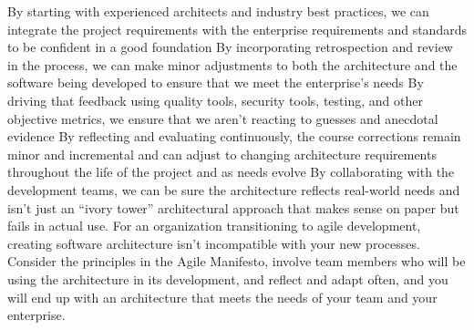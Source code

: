 By starting with experienced architects and industry best practices, we can integrate the project requirements with the enterprise requirements and standards to be confident in a good foundation
By incorporating retrospection and review in the process, we can make minor adjustments to both the architecture and the software being developed to ensure that we meet the enterprise's needs
By driving that feedback using quality tools, security tools, testing, and other objective metrics, we ensure that we aren't reacting to guesses and anecdotal evidence
By reflecting and evaluating continuously, the course corrections remain minor and incremental and can adjust to changing architecture requirements throughout the life of the project and as needs evolve
By collaborating with the development teams, we can be sure the architecture reflects real-world needs and isn’t just an “ivory tower” architectural approach that makes sense on paper but fails in actual use.
For an organization transitioning to agile development, creating software architecture isn’t incompatible with your new processes. Consider the principles in the Agile Manifesto, involve team members who will be using the architecture in its development, and reflect and adapt often, and you will end up with an architecture that meets the needs of your team and your enterprise.